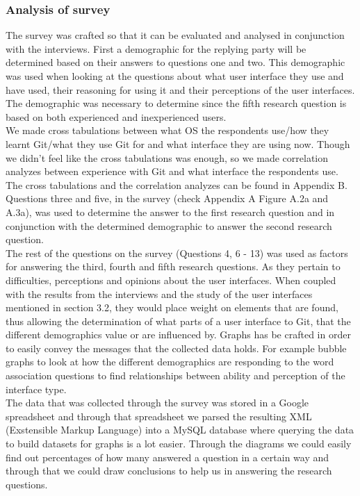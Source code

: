 \documentclass[a4paper,oneside]{bth} %
\begin{document}
					\subsubsection*{Analysis of survey}
					The survey was crafted so that it can be evaluated and analysed in conjunction with the interviews. 
					First a demographic for the replying party will be determined based on their answers to questions one and two. This demographic was used when looking at the questions about what user interface they use and have used, their reasoning for using it and their perceptions of the user interfaces. The demographic was necessary to determine since the fifth research question is based on both experienced and inexperienced users.\\
					We made cross tabulations between what OS the respondents use/how they learnt Git/what they use Git for and what interface they are using now. Though we didn't feel like the cross tabulations was enough, so we made correlation analyzes between experience with Git and what interface the respondents use.\\
					The cross tabulations and the correlation analyzes can be found in Appendix B.
					\\
					Questions three and five, in the survey (check Appendix A Figure A.2a and A.3a), was used to determine the answer to the first research question and in conjunction with the determined demographic to answer the second research question.
					\\
					The rest of the questions on the survey (Questions 4, 6 - 13) was used as factors for answering the third, fourth and fifth research questions. As they pertain to difficulties, perceptions and opinions about the user interfaces. When coupled with the results from the interviews and the study of the user interfaces mentioned in section 3.2, they would place weight on elements that are found, thus allowing the determination of what parts of a user interface to Git, that the different demographics value or are influenced by. Graphs has be crafted in order to easily convey the messages that the collected data holds. For example bubble graphs to look at how the different demographics are responding to the word association questions to find relationships between ability and perception of the interface type. 
					\\
					The data that was collected through the survey was stored in a Google spreadsheet \cite{GoogleSpreadsheet} and through that spreadsheet we parsed the resulting XML (Exstensible Markup Language) into a MySQL database where querying the data to build datasets for graphs is a lot easier.
					Through the diagrams we could easily find out percentages of how many answered a question in a certain way and through that we could draw conclusions to help us in answering the research questions.
					
\end{document}
